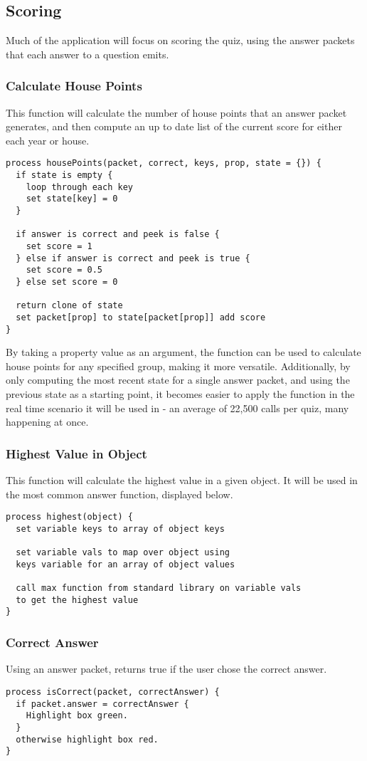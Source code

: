 \subsection{Scoring}
Much of the application will focus on scoring the quiz, using the answer packets that each answer to a question emits.

\subsubsection{Calculate House Points}
This function will calculate the number of house points that an answer packet generates, and then compute an up to date list of the current score for either each year or house.
\begin{verbatim}
process housePoints(packet, correct, keys, prop, state = {}) {
  if state is empty {
    loop through each key
    set state[key] = 0
  }

  if answer is correct and peek is false {
    set score = 1
  } else if answer is correct and peek is true {
    set score = 0.5
  } else set score = 0

  return clone of state
  set packet[prop] to state[packet[prop]] add score
}
\end{verbatim}
By taking a property value as an argument, the function can be used to calculate house points for any specified group, making it more versatile. Additionally, by only computing the most recent state for a single answer packet, and using the previous state as a starting point, it becomes easier to apply the function in the real time scenario it will be used in - an average of 22,500 calls per quiz, many happening at once.

\subsubsection{Highest Value in Object}
This function will calculate the highest value in a given object. It will be used in the most common answer function, displayed below.
\begin{verbatim}
process highest(object) {
  set variable keys to array of object keys

  set variable vals to map over object using
  keys variable for an array of object values

  call max function from standard library on variable vals
  to get the highest value
}
\end{verbatim}

\subsubsection{Correct Answer}
Using an answer packet, returns true if the user chose the correct answer.
\begin{verbatim}
process isCorrect(packet, correctAnswer) {
  if packet.answer = correctAnswer {
    Highlight box green.
  }
  otherwise highlight box red.
}
\end{verbatim}

